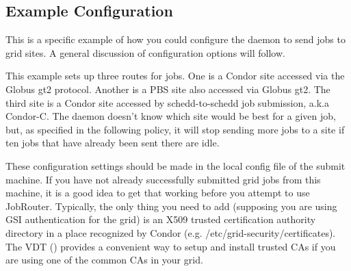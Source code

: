 \subsection{Example Configuration}\label{ExampleJobRouterConfiguration}

This is a specific example of how you could configure the  daemon to send
jobs to grid sites.  A general discussion of configuration options
will follow.

This example sets up three routes for jobs.  One is a Condor site
accessed via the Globus gt2 protocol.  Another is a PBS site also
accessed via Globus gt2.  The third site is a Condor site accessed by
schedd-to-schedd job submission, a.k.a Condor-C.  The  daemon
doesn't know which site would be best for a given job, but, as
specified in the following policy, it will stop sending more jobs to a
site if ten jobs that have already been sent there are idle.

These configuration settings should be made in the local config file
of the submit machine.  If you have not already successfully submitted
grid jobs from this machine, it is a good idea to get that working
before you attempt to use JobRouter.  Typically, the only thing you
need to add (supposing you are using GSI authentication for the grid)
is an X509 trusted certification authority directory in a place
recognized by Condor (e.g. /etc/grid-security/certificates).  The VDT
() provides a convenient way to setup and
install trusted CAs if you are using one of the common CAs in your
grid.

